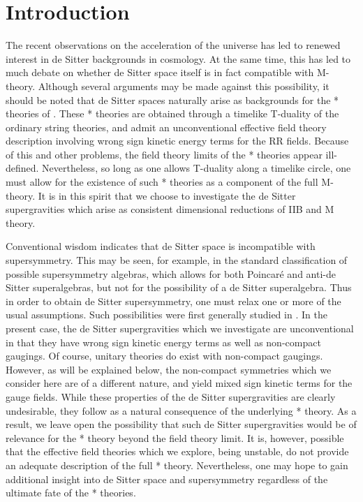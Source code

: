 \documentclass[a4paper,12pt]{article}
\begin{document}
\section{Introduction}

The recent observations on the acceleration of the universe has led to
renewed interest in de Sitter backgrounds in cosmology.  At the same
time, this has led to much debate on whether de Sitter space itself is
in fact compatible with M-theory.  Although several arguments may be
made against this possibility, it should be noted that de Sitter spaces
naturally arise as backgrounds for the * theories of
\cite{Hull:1998vg,Hull2,Hull3,Hull4,Hull}.  These * theories are obtained
through a timelike T-duality of the ordinary string theories, and admit an
unconventional effective field theory description involving wrong sign
kinetic energy terms for the RR fields.  Because of this and other
problems, the field theory limits of the * theories appear ill-defined.
Nevertheless, so long as one allows T-duality along a timelike circle,
one must allow for the existence of such * theories as a component of the
full M-theory.  It is in this spirit that we choose to investigate the
de Sitter supergravities which arise as consistent dimensional
reductions of IIB\myHighlight{$^*$}\coordHE{} and M\myHighlight{$^*$}\coordHE{} theory.

Conventional wisdom indicates that de Sitter space is
incompatible with supersymmetry.  This may be seen, for example, in
the standard classification of possible supersymmetry algebras, which allows
for both Poincar\'e and anti-de Sitter superalgebras, but not for the
possibility of a de Sitter superalgebra.  Thus in order to obtain de
Sitter supersymmetry, one must relax one or more of the usual assumptions.
Such possibilities were first generally studied in \cite{Lukierski,Pilch}.
In the present case, the de Sitter supergravities which we investigate
are unconventional in that they have wrong sign kinetic energy terms
as well as non-compact gaugings.  Of course, unitary theories do exist
with non-compact gaugings.  However, as will be explained below, the
non-compact symmetries which we consider here are of a different
nature, and yield mixed sign kinetic terms for the gauge fields.
While these properties of the de Sitter supergravities are clearly
undesirable, they follow as a natural consequence of the underlying *
theory.  As a result, we leave open the possibility that such de Sitter
supergravities would be of relevance for the * theory beyond the
field theory limit.  It is, however, possible that the effective field
theories which we explore, being unstable, do not provide an adequate
description of the full * theory.  Nevertheless, one may hope to gain
additional insight into de Sitter space and supersymmetry regardless of
the ultimate fate of the * theories.
\end{document}
